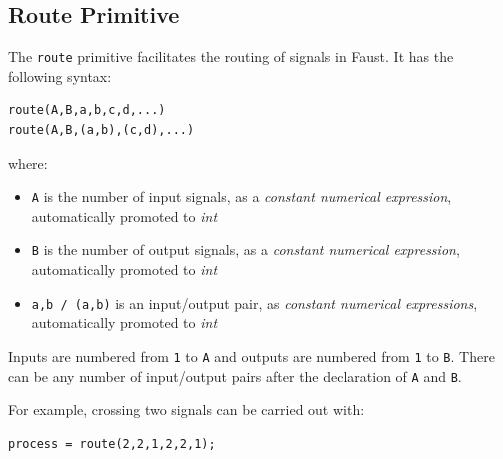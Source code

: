 

\subsection{Route Primitive }

The  \lstinline'route' primitive facilitates the routing of signals in Faust. It has the following syntax:

\begin{lstlisting}
route(A,B,a,b,c,d,...)
route(A,B,(a,b),(c,d),...)
\end{lstlisting}

where:

\begin{itemize} 
\item \lstinline'A' is the number of input signals, as a \textit{constant numerical expression}, automatically promoted to \textit{int}
\item \lstinline'B' is the number of output signals, as a \textit{constant numerical expression}, automatically promoted to \textit{int}
\item \lstinline'a,b / (a,b)' is an input/output pair, as \textit{constant numerical expressions}, automatically promoted to \textit{int}
\end{itemize}

Inputs are numbered from \lstinline'1' to \lstinline'A' and outputs are numbered from \lstinline'1' to \lstinline'B'. There can be any number of input/output pairs after the declaration of \lstinline'A' and \lstinline'B'.

For example, crossing two signals can be carried out with:

\begin{lstlisting}
process = route(2,2,1,2,2,1);
\end{lstlisting}

